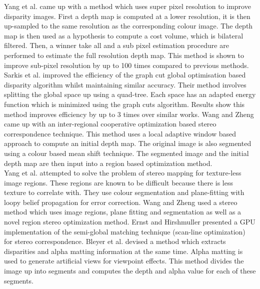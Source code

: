 Yang et al. \cite{Yang07Spatial} came up with a method which uses super pixel resolution to improve disparity images. First a depth map is computed at a lower resolution, it is then up-sampled to the same resolution as the corresponding colour image. The depth map is then used as a hypothesis to compute a cost volume, which is bilateral filtered. Then, a winner take all and a sub pixel estimation procedure are performed to estimate the full resolution depth map. This method is shown to improve sub-pixel resolution by up to 100 times compared to previous methods.\\


Sarkis et al. \cite{Sarkis07Fast} improved the efficiency of the graph cut global optimisation based disparity algorithm whilst maintaining similar accuracy. Their method involves splitting the global space up using a quad-tree. Each space has an adapted energy function which is minimized using the graph cuts algorithm. Results show this method improves efficiency by up to 3 times over similar works. Wang and Zheng \cite{Wang08Region} came up with an inter-regional cooperative optimization based stereo correspondence technique. This method uses a local adaptive window based approach to compute an initial depth map. The original image is also segmented using a colour based mean shift technique. The segmented image and the initial depth map are then input into a region based optimization method.  \\


Yang et al. \cite{Yang08Near} attempted to solve the problem of stereo mapping for texture-less image regions. These regions are known to be difficult because there is less texture to correlate with. They use colour segmentation and plane-fitting with loopy belief propagation for error correction. Wang and Zheng \cite{Wang08Region} used a stereo method which uses image regions, plane fitting and segmentation as well as a novel region stereo optimization method. Ernst and Hirshmuller \cite{Ernst08Mutual} presented a GPU implementation of the semi-global matching technique (scan-line optimization) for stereo correspondence. Bleyer et al. \cite{Bleyer09Stereo} devised a method which extracts disparities and alpha matting information at the same time. Alpha matting is used to generate artificial views for viewpoint effects. This method divides the image up into segments and computes the depth and alpha value for each of these segments. \\



